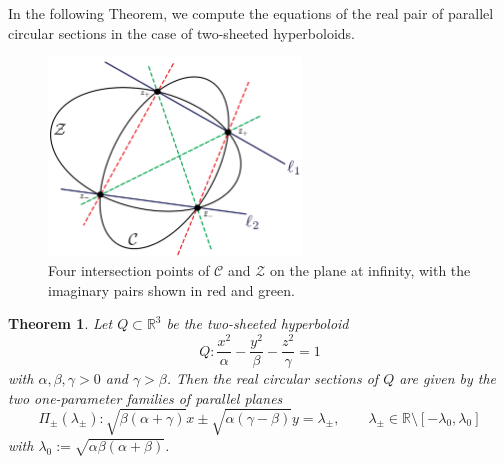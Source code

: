 \documentclass[10pt, a4paper]{article}
\theoremstyle{BoldTopSpacing}
\newtheorem{theorem}{Theorem}[section]
\theoremstyle{BoldTopSpacing}
\theoremstyle{BoldTopSpacing}
\theoremstyle{BoldTopBottomSpacing}
\theoremstyle{BoldTopSpacing}
\theoremstyle{BoldTopBottomSpacing}
\theoremstyle{remark}
\begin{document}
In the following Theorem, we compute the equations of the real pair of parallel circular sections in the case of two-sheeted hyperboloids.

\begin{figure}[H]
    \centering
    \includegraphics[width=0.6\textwidth]{conics-through-four-points.png}
    \caption[Four intersection points with the absolute conic at infinity.]{Four intersection points of $\mathcal{C}$ and $\mathcal{Z}$ on the plane at infinity, with the imaginary pairs shown in red and green.}
    \label{fig:conics-through-four-points}
\end{figure}

\begin{theorem}
\label{thm:circular-sections-hyperboloid}
Let $Q \subset \mathbb{R}^3$ be the two-sheeted hyperboloid
\begin{equation}
\label{eq:two-sheeted-alpha-beta-gamma}
Q : \frac{x^2}{\alpha} - \frac{y^2}{\beta} - \frac{z^2}{\gamma} = 1
\end{equation}
with $\alpha, \beta, \gamma > 0$ and $\gamma > \beta$. Then the real circular sections of $Q$ are given by the two one-parameter families of parallel planes
\begin{equation}
\label{eq:planes-two-sheeted}
\Pi_{\pm}(\lambda_{\pm}) :\sqrt{\beta (\alpha + \gamma)} x \pm \sqrt{\alpha (\gamma - \beta)} y = \lambda_{\pm}, \quad \quad \lambda_{\pm} \in \mathbb{R} \setminus \left[-\lambda_{0}, \lambda_{0} \right]
\end{equation}
with $\lambda_{0} := \sqrt{\alpha \beta (\alpha+\beta)}$.
\end{theorem}
\end{document}

